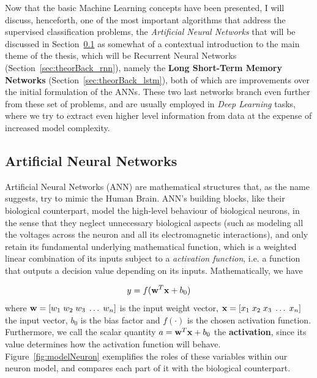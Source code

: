 Now that the basic Machine Learning concepts have been presented, I will discuss, henceforth, one of the most important algorithms that address the supervised classification problems, the \emph{Artificial Neural Networks} that will be discussed in Section~\ref{sec:theorBack_ann} as somewhat of a contextual introduction to the main theme of the thesis, which will be Recurrent Neural Networks (Section~\ref{sec:theorBack_rnn}), namely the \textbf{Long Short-Term Memory Networks} (Section~\ref{sec:theorBack_lstm}), both of which are improvements over the initial formulation of the ANNs. These two last networks branch even further from these set of problems, and are usually employed in \textit{Deep Learning} tasks, where we try to extract even higher level information from data at the expense of increased model complexity. 

\subsection{Artificial Neural Networks}\label{sec:theorBack_ann}

Artificial Neural Networks (ANN) are mathematical structures that, as the name suggests, try to mimic the Human Brain. ANN's building blocks, like their biological counterpart, model the high-level behaviour of biological neurons, in the sense that they neglect unnecessary biological aspects (such as modeling all the voltages across the neuron and all its electromagnetic interactions), and only retain its fundamental underlying mathematical function, which is a weighted linear combination of its inputs subject to a \emph{activation function}, i.e. a function that outputs a decision value depending on its inputs.  Mathematically, we have

\begin{equation}
	y = f(\mathbf{w}^T \mathbf{x} + b_0)
\end{equation}
where $\mathbf{w} = \left[ w_1 \; w_2 \;  w_3 \;  \dots \; w_n \right]$ is the input weight vector, $\mathbf{x} = \left[ x_1 \; x_2 \; x_3 \; \dots \; x_n \right]$ the input vector, $b_0$ is the bias factor and $f(\cdot)$ is the chosen activation function. Furthermore, we call the scalar quantity $a = \mathbf{w}^T \mathbf{x} + b_0$ the \textbf{activation}, since its value determines how the activation function will behave. Figure~\ref{fig:modelNeuron} exemplifies the roles of these variables within our neuron model, and compares each part of it with the biological counterpart.

